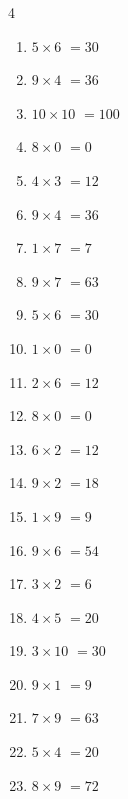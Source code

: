 \begin{multicols}{4}
\begin{enumerate}
  \item $5\times 6$
        $=30$

  \item $9\times 4$
        $=36$

  \item $10\times 10$
        $=100$

  \item $8\times 0$
        $=0$

  \item $4\times 3$
        $=12$

  \item $9\times 4$
        $=36$

  \item $1\times 7$
        $=7$

  \item $9\times 7$
        $=63$

  \item $5\times 6$
        $=30$

  \item $1\times 0$
        $=0$

  \item $2\times 6$
        $=12$

  \item $8\times 0$
        $=0$

  \item $6\times 2$
        $=12$

  \item $9\times 2$
        $=18$

  \item $1\times 9$
        $=9$

  \item $9\times 6$
        $=54$

  \item $3\times 2$
        $=6$

  \item $4\times 5$
        $=20$

  \item $3\times 10$
        $=30$

  \item $9\times 1$
        $=9$

  \item $7\times 9$
        $=63$

  \item $5\times 4$
        $=20$

\columnbreak %

  \item $8\times 9$
        $=72$


\end{enumerate}
\end{multicols}
